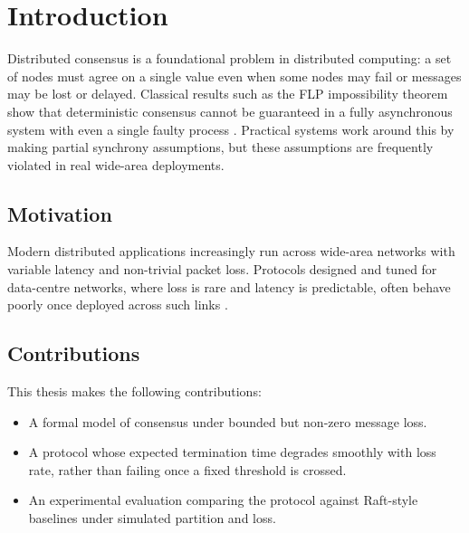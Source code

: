 \chapter{Introduction}
Distributed consensus is a foundational problem in distributed computing: a set
of nodes must agree on a single value even when some nodes may fail or messages
may be lost or delayed. Classical results such as the FLP impossibility theorem
show that deterministic consensus cannot be guaranteed in a fully asynchronous
system with even a single faulty process \cite{Fischer1985}. Practical systems
work around this by making partial synchrony assumptions, but these assumptions
are frequently violated in real wide-area deployments.

\section{Motivation}
Modern distributed applications increasingly run across wide-area networks with
variable latency and non-trivial packet loss. Protocols designed and tuned for
data-centre networks, where loss is rare and latency is predictable, often behave
poorly once deployed across such links \cite{Ongaro2014}.

\section{Contributions}
This thesis makes the following contributions:
\begin{itemize}
  \item A formal model of consensus under bounded but non-zero message loss.
  \item A protocol whose expected termination time degrades smoothly with loss
    rate, rather than failing once a fixed threshold is crossed.
  \item An experimental evaluation comparing the protocol against Raft-style
    baselines \cite{Ongaro2014} under simulated partition and loss.
\end{itemize}




